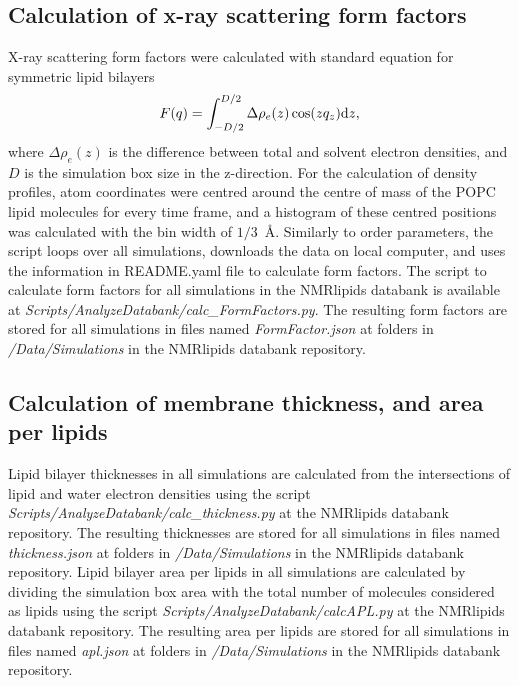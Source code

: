\documentclass[fleqn,10pt]{wlscirep}
\begin{document}
\subsection{Calculation of x-ray scattering form factors}
X-ray scattering form factors were calculated with standard equation for symmetric lipid bilayers~\cite{ollila16}
\begin{equation}\label{FFsimpl}
F(q)=\int_{-D/2}^{D/2}\Delta \rho_e(z) \cos(zq_z) {\rm d}z,
\end{equation}
where $\Delta \rho_e(z)$ is the difference between total and solvent electron densities, and $D$ is the simulation box size in the z-direction. For the calculation of density profiles, atom coordinates were centred around the centre of mass of the POPC lipid molecules for every time frame, and a histogram of these centred positions was calculated with the bin width of $1/3$~Å. Similarly to order parameters, the script loops over all simulations, downloads the data on local computer, and uses the information in README.yaml file to calculate form factors. The script to calculate form factors for all simulations in the NMRlipids databank is available at {\it Scripts/AnalyzeDatabank/calc\_FormFactors.py}.  The resulting form factors are stored for all simulations in files named {\it FormFactor.json} at folders in {\it /Data/Simulations} in the NMRlipids databank repository.

\subsection{Calculation of membrane thickness, and area per lipids}
Lipid bilayer thicknesses in all simulations are calculated from the intersections of lipid and water electron densities using the script {\it Scripts/AnalyzeDatabank/calc\_thickness.py} at the NMRlipids databank repository. The resulting thicknesses are stored for all simulations in files named {\it thickness.json} at folders in {\it /Data/Simulations} in the NMRlipids databank repository. Lipid bilayer area per lipids in all simulations are calculated by dividing the simulation box area with the total number of molecules considered as lipids using the script {\it Scripts/AnalyzeDatabank/calcAPL.py} at the NMRlipids databank repository. The resulting area per lipids are stored for all simulations in files named {\it apl.json} at folders in {\it /Data/Simulations} in the NMRlipids databank repository.
\end{document}
